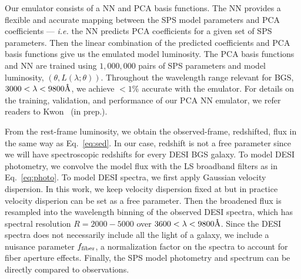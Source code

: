 Our emulator consists of a NN and PCA basis functions. 
The NN provides a flexible and accurate mapping between the SPS model
parameters and PCA coefficients --- \emph{i.e.} the NN predicts PCA
coefficients for a given set of SPS parameters. 
Then the linear combination of the predicted coefficients and PCA basis
functions give us the emulated model luminosity. 
The PCA basis functions and NN are trained using $1,000,000$ pairs of SPS
parameters and model luminosity, $(\theta, L(\lambda;\theta))$. 
Throughout the wavelength range relevant for BGS, $3000 < \lambda < 9800\AA$,
we achieve $< 1\%$ accurate with the emulator. 
For details on the training, validation, and performance of our PCA NN
emulator, we refer readers to Kwon \etal~(in prep.). 

From the rest-frame luminosity, we obtain the observed-frame, redshifted, flux
in the same way as Eq.~\ref{eq:sed}.
In our case, redshift is not a free parameter since we will have spectroscopic
redshifts for every DESI BGS galaxy.
To model DESI photometry, we convolve the model flux with the LS broadband
filters as in Eq.~\ref{eq:photo}.
To model DESI spectra, we first apply Gaussian velocity dispersion. 
In this work, we keep velocity dispersion fixed at  but in
practice velocity disperion can be set as a free parameter. 
Then the broadened flux is resampled into the wavelength binning of the
observed DESI spectra, which has spectral resolution $R = 2000 - 5000$ over
$3600 < \lambda < 9800\AA$. 
Since the DESI spectra does not necessarily include all the light of a galaxy,
we include a nuisance parameter $f_{\rm fiber}$, a normalization factor on the
spectra to account for fiber aperture effects. 
Finally, the SPS model photometry and spectrum can be directly compared to
observations.

